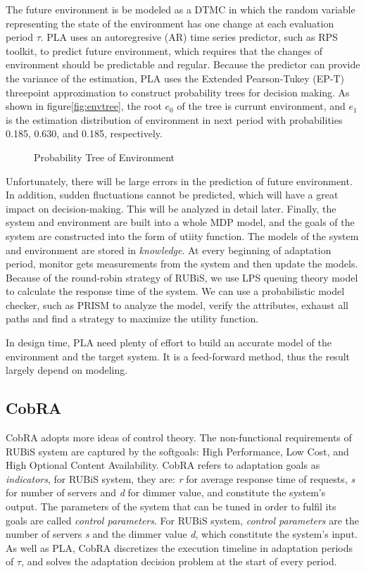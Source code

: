 \documentclass[sigconf]{acmart}
\begin{document}
The future environment is be modeled as a DTMC in which the random variable representing the state of the environment has one change at each evaluation period $\tau$. PLA uses an autoregresive (AR) time series predictor\cite{ar}, such as RPS toolkit\cite{rps}, to predict future environment, which requires that the changes of environment should be predictable and regular. Because the predictor can provide the variance of the estimation, PLA uses the Extended Pearson-Tukey (EP-T)\cite{ept} threepoint approximation to construct probability trees for decision making. As shown in figure\ref{fig:envtree}, the root $e_{0}$ of the tree is currunt environment, and $e_{1}$ is the estimation distribution of environment in next period with probabilities 0.185, 0.630, and 0.185, respectively.
\begin{figure}[h]
	\centering
	\caption{Probability Tree of Environment}
\end{figure}
Unfortunately, there will be large errors in the prediction of future environment. In addition, sudden fluctuations cannot be predicted, which will have a great impact on decision-making. This will be analyzed in detail later. Finally, the system and environment are built into a whole MDP model, and the goals of the system are constructed into the form of utiity function. 
The models of the system and environment are stored in \textit{knowledge}. At every beginning of adaptation period, monitor gets measurements from the system and then update the models. Because of the round-robin strategy of RUBiS, we use LPS queuing theory model\cite{lps} to calculate the response time of the system.
We can use a probabilistic model checker\cite{pmd}, such as PRISM\cite{prism} to analyze the model, verify the attributes, exhaust all paths and find a strategy to maximize the utility function. 

In design time, PLA need plenty of effort to build an accurate model of the environment and the target system. It is a feed-forward method, thus the result largely depend on modeling.

\subsection{CobRA}
CobRA adopts more ideas of control theory.
The non-functional requirements of RUBiS system are captured by the softgoals: High Performance, Low Cost, and High Optional Content Availability.
CobRA refers to adaptation goals as \textit{indicators}, for RUBiS system, they are: \textit{r} for average response time of requests, \textit{s} for number of servers and \textit{d} for dimmer value, and constitute the system's output. The parameters of the system that can be tuned in order to fulfil its goals are called \textit{control parameters}. For RUBiS system, \textit{control parameters} are the number of servers \textit{s} and the dimmer value \textit{d}, which constitute the system's input. As well as PLA, CobRA discretizes the execution timeline in adaptation periods of $\tau$, and solves the adaptation decision problem at the start of every period.
\end{document}
